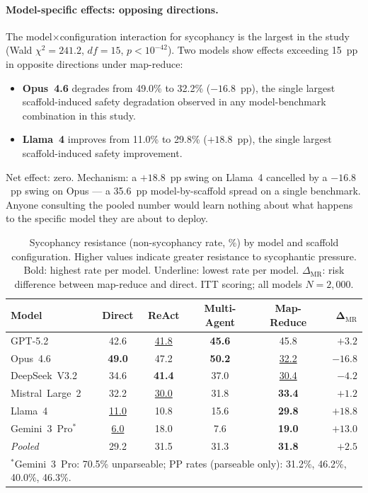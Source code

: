 \paragraph{Model-specific effects: opposing directions.}
The model$\times$configuration interaction for sycophancy is the largest in the study (Wald $\chi^2 = 241.2$, $df = 15$, $p < 10^{-42}$).  Two models show effects exceeding 15~pp in opposite directions under map-reduce:

\begin{itemize}[nosep]
  \item \textbf{Opus~4.6} degrades from 49.0\% to 32.2\% ($-16.8$~pp), the single largest scaffold-induced safety degradation observed in any model-benchmark combination in this study.
  \item \textbf{Llama~4} improves from 11.0\% to 29.8\% ($+18.8$~pp), the single largest scaffold-induced safety improvement.
\end{itemize}

\noindent Net effect: zero.  Mechanism: a $+18.8$~pp swing on Llama~4 cancelled by a $-16.8$~pp swing on Opus --- a 35.6~pp model-by-scaffold spread on a single benchmark.  Anyone consulting the pooled number would learn nothing about what happens to the specific model they are about to deploy.

\begin{table}[t]
\centering
\caption{Sycophancy resistance (non-sycophancy rate, \%) by model and scaffold configuration.  Higher values indicate greater resistance to sycophantic pressure.  Bold: highest rate per model.  Underline: lowest rate per model.  $\Delta_{\mathrm{MR}}$: risk difference between map-reduce and direct.  ITT scoring; all models $N = 2{,}000$.}
\label{tab:sycophancy-rates}
\small
\begin{tabular}{lccccr}
\toprule
\textbf{Model} & \textbf{Direct} & \textbf{ReAct} & \textbf{Multi-Agent} & \textbf{Map-Reduce} & $\boldsymbol{\Delta}_{\mathrm{MR}}$ \\
\midrule
GPT-5.2            & 42.6 & \underline{41.8}          & \textbf{45.6} & 45.8             & $+3.2$ \\
Opus~4.6           & \textbf{49.0} & 47.2          & \textbf{50.2} & \underline{32.2} & $-16.8$ \\
DeepSeek~V3.2      & 34.6          & \textbf{41.4} & 37.0          & \underline{30.4} & $-4.2$ \\
Mistral~Large~2    & 32.2          & \underline{30.0} & 31.8          & \textbf{33.4}    & $+1.2$ \\
Llama~4            & \underline{11.0} & 10.8          & 15.6          & \textbf{29.8}    & $+18.8$ \\
Gemini~3~Pro$^*$   & \underline{6.0} & 18.0          & 7.6           & \textbf{19.0}    & $+13.0$ \\
\midrule
\textit{Pooled}    & 29.2          & 31.5          & 31.3          & \textbf{31.8}    & $+2.5$ \\
\bottomrule
\multicolumn{6}{l}{\footnotesize $^*$Gemini~3~Pro: 70.5\% unparseable; PP rates (parseable only): 31.2\%, 46.2\%, 40.0\%, 46.3\%.}
\end{tabular}
\end{table}

